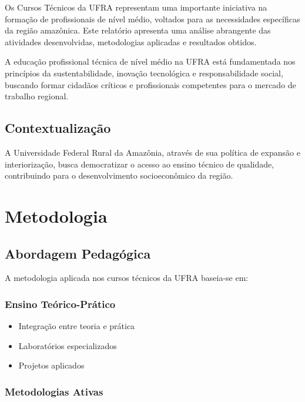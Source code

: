 \documentclass[
  12pt,
  letterpaper,
]{report}
\providecommand{\tightlist}{%
  \setlength{\itemsep}{0pt}\setlength{\parskip}{0pt}}\usepackage{longtable,booktabs,array}
\begin{document}
Os Cursos Técnicos da UFRA representam uma importante iniciativa na
formação de profissionais de nível médio, voltados para as necessidades
específicas da região amazônica. Este relatório apresenta uma análise
abrangente das atividades desenvolvidas, metodologias aplicadas e
resultados obtidos.

A educação profissional técnica de nível médio na UFRA está fundamentada
nos princípios da sustentabilidade, inovação tecnológica e
responsabilidade social, buscando formar cidadãos críticos e
profissionais competentes para o mercado de trabalho regional.

\section{Contextualização}\label{contextualizauxe7uxe3o}

A Universidade Federal Rural da Amazônia, através de sua política de
expansão e interiorização, busca democratizar o acesso ao ensino técnico
de qualidade, contribuindo para o desenvolvimento socioeconômico da
região.


\chapter{Metodologia}\label{metodologia}

\section{Abordagem Pedagógica}\label{abordagem-pedaguxf3gica}

A metodologia aplicada nos cursos técnicos da UFRA baseia-se em:

\subsection{Ensino Teórico-Prático}\label{ensino-teuxf3rico-pruxe1tico}

\begin{itemize}
\tightlist
\item
  Integração entre teoria e prática
\item
  Laboratórios especializados
\item
  Projetos aplicados
\end{itemize}

\subsection{Metodologias Ativas}\label{metodologias-ativas}
\end{document}
